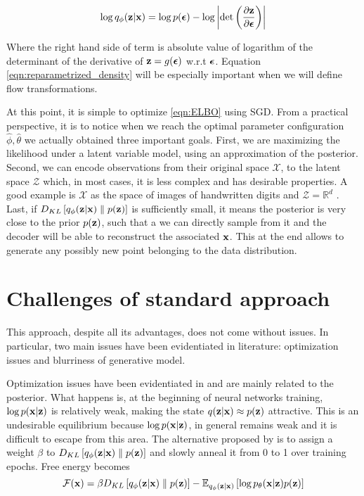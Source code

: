 \documentclass[12pt]{article}
\begin{document}
\begin{equation}
    \label{eqn:reparametrized_density}
    \log q_\phi (\textbf{z}|\textbf{x}) = \log p(\bm{\epsilon}) - \log \left| \det \left( \frac{\partial\textbf{z}}{\partial\bm{\epsilon}}\right) \right|
\end{equation}

Where the right hand side of term is absolute value of logarithm of the determinant of the derivative of \(\textbf{z}=g(\bm{\epsilon})\) w.r.t \(\bm{\epsilon}\). Equation \eqref{eqn:reparametrized_density} will be especially important when we will define flow transformations. 


At this point, it is simple to optimize \eqref{eqn:ELBO} using SGD. From a practical perspective, it is to notice when we reach the optimal parameter configuration \(\hat{\phi}, \hat{\theta}\) we actually obtained three important goals. First, we are maximizing the likelihood under a latent variable model, using an approximation of the posterior. Second, we can encode observations from their original space \(\mathcal{X}\), to the latent space \(\mathcal{Z}\) which, in most cases, it is less complex and has desirable properties. A good example is \(\mathcal{X}\) as the space of images of handwritten digits and \(\mathcal{Z} = \mathbb{R}^d\) \cite{kingma2022autoencoding}. Last, if \(D_{KL}\left[ q_{\phi}(\textbf{z}|\textbf{x}) \parallel p(\textbf{z}) \right]\) is sufficiently small, it means the posterior is very close to the prior \(p(\textbf{z})\), such that a we can directly sample from it and the decoder will be able to reconstruct the associated \(\textbf{x}\). This at the end allows to generate any possibly new point belonging to the data distribution. 

\section{Challenges of standard approach}
This approach, despite all its advantages, does not come without issues. In particular, two main issues have been evidentiated in literature: optimization issues and blurriness of generative model.

Optimization issues have been evidentiated in \cite{VAEIntro}\cite{bowman-etal-2015-large}\cite{Snderby2016LadderVA} and are mainly related to the posterior. What happens is, at the beginning of neural networks training, \(\log p (\textbf{x}|\textbf{z})\) is relatively weak, making the state \(q(\textbf{z}|\textbf{x}) \approx p(\textbf{z})\) attractive. This is an undesirable equilibrium because \(\log p (\textbf{x}|\textbf{z})\), in general remains weak and it is difficult to escape from this area. The alternative proposed by \cite{bowman-etal-2015-large}\cite{Snderby2016LadderVA} is to assign a weight \(\beta\) to \(D_{KL}\left[ q_{\phi}(\textbf{z}|\textbf{x}) \parallel p(\textbf{z}) \right]\) and slowly anneal it from 0 to 1 over training epochs. Free energy becomes
\begin{equation}
    \mathcal{F}(\textbf{x}) = \beta D_{KL}\left[ q_{\phi}(\textbf{z}|\textbf{x}) \parallel p(\textbf{z}) \right] - \mathbb{E}_{q_{\phi}(\textbf{z}|\textbf{x})} \left[ \log p_{\theta}(\textbf{x}|\textbf{z})p(\textbf{z}) \right]
\end{equation}
\end{document}
